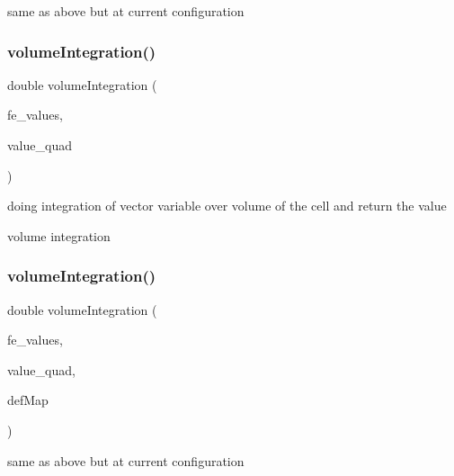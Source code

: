 same as above but at current configuration \mbox{\label{class_residual_ab9fdc6a8b102af5beaa1e4eb6fb7fa40}} 
\subsubsection{\texorpdfstring{volumeIntegration()}{volumeIntegration()}\hspace{0.1cm}{\footnotesize\ttfamily [3/6]}}
{\footnotesize\ttfamily double volume\+Integration (\begin{DoxyParamCaption}\item[{const F\+E\+Values$<$ dim $>$ \&}]{fe\+\_\+values,  }\item[{Table$<$ 1, Sacado\+::\+Fad\+::\+D\+Fad$<$ double $>$ $>$ \&}]{value\+\_\+quad }\end{DoxyParamCaption})}

doing integration of vector variable over volume of the cell and return the value

volume integration \mbox{\label{class_residual_a50acc2c1f154889f83606a2b2e2d555c}} 
\subsubsection{\texorpdfstring{volumeIntegration()}{volumeIntegration()}\hspace{0.1cm}{\footnotesize\ttfamily [4/6]}}
{\footnotesize\ttfamily double volume\+Integration (\begin{DoxyParamCaption}\item[{const F\+E\+Values$<$ dim $>$ \&}]{fe\+\_\+values,  }\item[{Table$<$ 1, Sacado\+::\+Fad\+::\+D\+Fad$<$ double $>$ $>$ \&}]{value\+\_\+quad,  }\item[{\mbox{\hyperlink{structdeformation_map}{deformation\+Map}}$<$ T, dim $>$ \&}]{def\+Map }\end{DoxyParamCaption})}

same as above but at current configuration \mbox{\label{class_residual_a734c1bb6a4a56aa1c774485441e47340}} 
